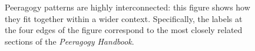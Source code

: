 \newpage

\afterpage{\clearpage}
\begin{figure}[p]
\vspace{-.9in}
{\centering
\resizebox{.8\textwidth}{!}{}

\par
}
\vspace{-.9in}
\captionsetup{format=larger,width=.8\textwidth}
\caption{Peeragogy patterns are highly interconnected: this figure
  shows how they fit together within a wider context.  Specifically,
  the labels at the four edges of the figure correspond to the most
  closely related sections of the \emph{Peeragogy
    Handbook}.\label{fig:connections}}
\end{figure}
\FloatBarrier

\newpage

%  

  

